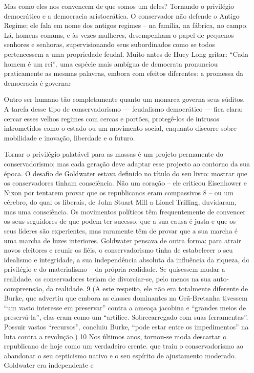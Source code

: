  \par 
Mas como eles nos convencem de que somos um deles? Tornando o privilégio democrático e a democracia aristocrática. O conservador não defende o Antigo Regime; ele fala em nome dos antigos regimes – na família, na fábrica, no campo. Lá, homens comuns, e às vezes mulheres, desempenham o papel de pequenos senhores e senhoras, supervisionando seus subordinados como se todos pertencessem a uma propriedade feudal. Muito antes de Huey Long gritar: “Cada homem é um rei”, uma espécie mais ambígua de democrata pronunciou praticamente as mesmas palavras, embora com efeitos diferentes: a promessa da democracia é governar
 \par 
Outro ser humano tão completamente quanto um monarca governa seus súditos. A tarefa desse tipo de conservadorismo — feudalismo democrático — fica clara: cercar esses velhos regimes com cercas e portões, protegê-los de intrusos intrometidos como o estado ou um movimento social, enquanto discorre sobre mobilidade e inovação, liberdade e o futuro.
 \par 
Tornar o privilégio palatável para as massas é um projeto permanente do conservadorismo; mas cada geração deve adaptar esse projecto ao contorno da sua época. O desafio de Goldwater estava definido no título do seu livro: mostrar que os conservadores tinham consciência. Não um coração – ele criticou Eisenhower e Nixon por tentarem provar que os republicanos eram compassivos {\color{blue}8} – ou um cérebro, do qual os liberais, de John Stuart Mill a Lionel Trilling, duvidaram, mas uma consciência. Os movimentos políticos têm frequentemente de convencer os seus seguidores de que podem ter sucesso, que a sua causa é justa e que os seus líderes são experientes, mas raramente têm de provar que a sua marcha é uma marcha de luzes interiores. Goldwater pensava de outra forma: para atrair novos eleitores e reunir os fiéis, o conservadorismo tinha de estabelecer o seu idealismo e integridade, a sua independência absoluta da influência da riqueza, do privilégio e do materialismo – da própria realidade. Se quisessem mudar a realidade, os conservadores teriam de divorciar-se, pelo menos na sua auto-compreensão, da realidade. {\color{blue}9} (A este respeito, ele não era totalmente diferente de Burke, que advertiu que embora as classes dominantes na Grã-Bretanha tivessem “um vasto interesse em preservar” contra a ameaça jacobina e “grandes meios de preservá-la”, elas eram como um “artífice. Sobrecarregado com suas ferramentas”. Possuir vastos “recursos”, concluiu Burke, “pode estar entre os impedimentos” na luta contra a revolução.) {\color{blue}10} Nos últimos anos, tornou-se moda descartar o republicano de hoje como um verdadeiro crente. que traiu o conservadorismo ao abandonar o seu cepticismo nativo e o seu espírito de ajustamento moderado. Goldwater era independente e
